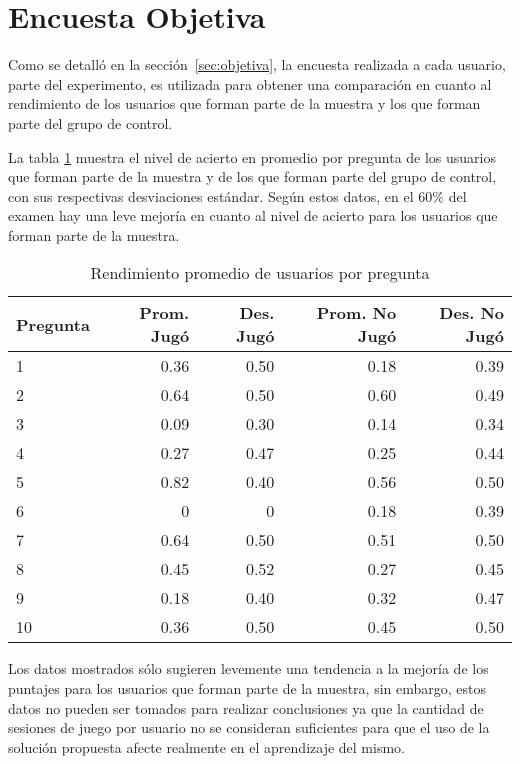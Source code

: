 \section{Encuesta Objetiva}
\label{sec:res_OBJETIVA}

Como se detalló en la sección~\ref{sec:objetiva}, la encuesta realizada a cada
usuario, parte del experimento, es utilizada para obtener una comparación en
cuanto al rendimiento de los usuarios que forman parte de la muestra y los que
forman parte del grupo de control.

La tabla \ref{tab:objetiva_rendimiento_por_pregunta} muestra el nivel de acierto
en promedio por pregunta de los usuarios que forman parte de la muestra y de los que
forman parte del grupo de control, con sus respectivas desviaciones estándar. Según
estos datos, en el $60\%$ del examen hay una leve mejoría en cuanto al nivel de acierto
para los usuarios que forman parte de la muestra.

\begin{table}[!hbt]
\centering
\begin{tabular}{|l|r|r|r|r|}
\hline
\rowcolor{gris} 
\textbf{Pregunta} & 
\textbf{Prom. Jugó} & 
\textbf{Des. Jugó} & 
\textbf{Prom. No Jugó} & 
\textbf{Des. No Jugó} \\
\hline
1 & 0.36 & 0.50 & 0.18 & 0.39 \\
\hline
2 & 0.64 & 0.50 & 0.60 & 0.49 \\
\hline
3 & 0.09 & 0.30 & 0.14 & 0.34 \\
\hline
4 & 0.27 & 0.47 & 0.25 & 0.44 \\
\hline
5 & 0.82 & 0.40 & 0.56 & 0.50 \\
\hline
6 & 0 & 0 & 0.18 & 0.39 \\
\hline
7 & 0.64 & 0.50 & 0.51 & 0.50 \\
\hline
8 & 0.45 & 0.52 & 0.27 & 0.45 \\
\hline
9 & 0.18 & 0.40 & 0.32 & 0.47 \\
\hline
10 & 0.36 & 0.50 & 0.45 & 0.50 \\
\hline
\end{tabular}
\caption{Rendimiento promedio de usuarios por pregunta}
\label{tab:objetiva_rendimiento_por_pregunta}
\end{table}

Los datos mostrados sólo sugieren levemente una tendencia a la mejoría de los puntajes 
para los usuarios que forman parte de la muestra, sin embargo, estos datos no pueden ser 
tomados para realizar conclusiones ya que la cantidad de sesiones de juego por usuario no 
se consideran suficientes para que el uso de la solución propuesta afecte realmente en el 
aprendizaje del mismo.
